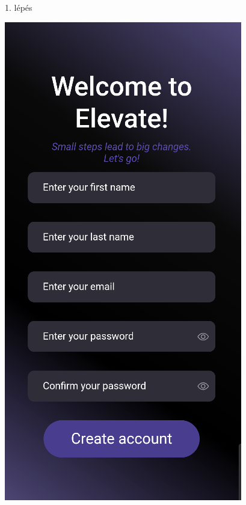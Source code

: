 \documentclass[12pt]{report}
\begin{document}
\begin{figure}[H]
\begin{minipage}[b]{0.23\textwidth}
       1. lépés
    \end{minipage}
    \hfill
    \begin{minipage}[b]{0.23\textwidth}
        \centering
        \includegraphics[width=\linewidth]{src/loginpage2.png}

\end{minipage}
\end{figure}
\end{document}
